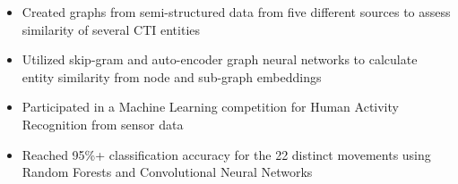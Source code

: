 
\begin{itemize}
    \item Created graphs from semi-structured data from five different sources to assess similarity of several CTI entities
    \item Utilized skip-gram and auto-encoder graph neural networks to calculate entity similarity from node and sub-graph embeddings
\end{itemize}

\divider

\begin{itemize}
    \item Participated in a Machine Learning competition for Human Activity Recognition from sensor data
    \item Reached 95\%+ classification accuracy for the 22 distinct movements using Random Forests and Convolutional Neural Networks
\end{itemize}

\divider






